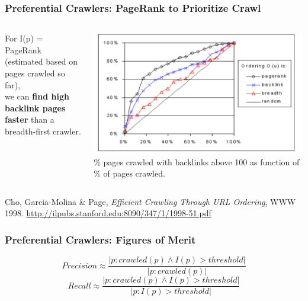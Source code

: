 \documentclass{beamer}
\begin{document}
\begin{frame} \frametitle{Preferential Crawlers: PageRank to
    Prioritize Crawl}

  \begin{columns}[T]

    \begin{column}{0.4\textwidth}

For I(p) = PageRank \\
 (estimated based on pages crawled so far), \\
we can {\bf find high backlink pages faster} than a breadth-first crawler. 

    \end{column}

    \begin{column}{0.6\textwidth}
     
     \includegraphics[width=\textwidth]{cho-molina-focused-crawlers}
     \small{ \%  pages crawled with backlinks above 100 as function of \% of pages crawled.}

    \end{column}

\end{columns}

\vfill

\small{Cho, Garcia-Molina \& Page, {\em Efficient Crawling Through URL
  Ordering}, WWW 1998. \url{http://ilpubs.stanford.edu:8090/347/1/1998-51.pdf}}

\end{frame}


\begin{frame} \frametitle{Preferential Crawlers: Figures of Merit}

\begin{equation*}
Precision \approx \frac{| p: crawled(p) \wedge I(p) > threshold |} {| p: crawled(p) |}
\end{equation*}
\vfill
\begin{equation*}
Recall \approx  \frac{| p: crawled(p) \wedge I(p) > threshold |}{ | p: I(p) > threshold|}
\end{equation*}

\end{frame}
\end{document}
